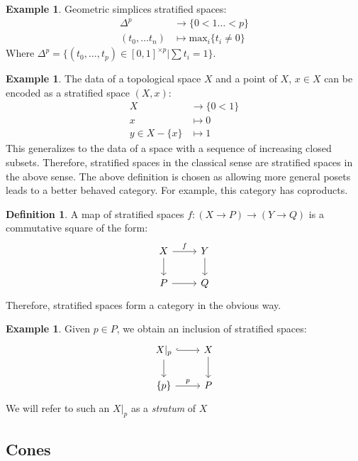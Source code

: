 \documentclass[11pt,reqno]{amsart}
\theoremstyle{plain}
\numberwithin{equation}{section}
\theoremstyle{remark}
\theoremstyle{definition}
\newtheorem{defi}[thm]{Definition}
\newtheorem{ex}[thm]{Example}
\begin{document}
\begin{ex}
Geometric simplices stratified spaces:
\begin{align*}
\Delta^p &\rightarrow \{0 < 1 \dots <p \} \\
( t_0, \dots t_n) &\mapsto \mathrm{max}_i \{ t_i \neq 0\}
\end{align*}
Where $\Delta^p = \{ (t_0 , \dots , t_p) \in [0, 1]^{\times p} | \sum t_i =1 \}$. 
\end{ex}

\begin{ex}
The data of a topological space $X$ and a point of $X$, $x \in X$ can be encoded as a stratified space $(X, x)$:
\begin{align*}
X &\longrightarrow \{0 <1\} \\
x &\longmapsto 0 \\
y \in X - \{x\} & \longmapsto 1
\end{align*}
This generalizes to the data of a space with a sequence of increasing closed subsets. Therefore, stratified spaces in the classical sense are stratified spaces in the above sense. The above definition is chosen as allowing more general posets leads to a better behaved category. For example, this category has coproducts. 
\end{ex}


\begin{defi}
A map of stratified spaces $f :(X\rightarrow P) \rightarrow (Y \rightarrow Q)$ is a commutative square of the form:
$$
\begin{tikzcd}
X \arrow[r, "f"] \arrow[d] & Y \arrow[d] \\
P \arrow[r]                & Q          
\end{tikzcd}
$$
Therefore, stratified spaces form a category in the obvious way. 
\end{defi}

\begin{ex}
Given $p \in P$, we obtain an inclusion of stratified spaces:
$$
\begin{tikzcd}
X|_p \arrow[d] \arrow[r, hook] & X \arrow[d] \\
\{p\} \arrow[r, "p"]           & P          
\end{tikzcd}
$$
We will refer to such an $X|_p$ as a \textit{stratum} of $X$
\end{ex}

\subsection{Cones}
\end{document}
